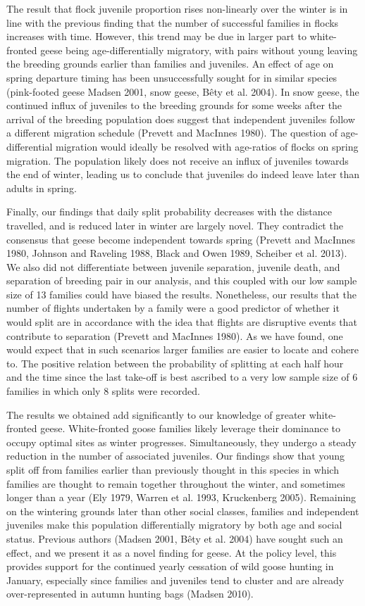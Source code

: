 \documentclass[10pt,twocolumn]{paper}
\begin{document}
The result that flock juvenile proportion rises non-linearly over the
winter is in line with the previous finding that the number of
successful families in flocks increases with time. However, this trend
may be due in larger part to white-fronted geese being
age-differentially migratory, with pairs without young leaving the
breeding grounds earlier than families and juveniles. An effect of age
on spring departure timing has been unsuccessfully sought for in similar
species (pink-footed geese Madsen 2001, snow geese, Bêty et al. 2004).
In snow geese, the continued influx of juveniles to the breeding grounds
for some weeks after the arrival of the breeding population does suggest
that independent juveniles follow a different migration schedule
(Prevett and MacInnes 1980). The question of age-differential migration
would ideally be resolved with age-ratios of flocks on spring migration.
The population likely does not receive an influx of juveniles towards
the end of winter, leading us to conclude that juveniles do indeed leave
later than adults in spring.

Finally, our findings that daily split probability decreases with the
distance travelled, and is reduced later in winter are largely novel.
They contradict the consensus that geese become independent towards
spring (Prevett and MacInnes 1980, Johnson and Raveling 1988, Black and
Owen 1989, Scheiber et al. 2013). We also did not differentiate between
juvenile separation, juvenile death, and separation of breeding pair in
our analysis, and this coupled with our low sample size of 13 families
could have biased the results. Nonetheless, our results that the number
of flights undertaken by a family were a good predictor of whether it
would split are in accordance with the idea that flights are disruptive
events that contribute to separation (Prevett and MacInnes 1980). As we
have found, one would expect that in such scenarios larger families are
easier to locate and cohere to. The positive relation between the
probability of splitting at each half hour and the time since the last
take-off is best ascribed to a very low sample size of 6 families in
which only 8 splits were recorded.

The results we obtained add significantly to our knowledge of greater
white-fronted geese. White-fronted goose families likely leverage their
dominance to occupy optimal sites as winter progresses. Simultaneously,
they undergo a steady reduction in the number of associated juveniles.
Our findings show that young split off from families earlier than
previously thought in this species in which families are thought to
remain together throughout the winter, and sometimes longer than a year
(Ely 1979, Warren et al. 1993, Kruckenberg 2005). Remaining on the
wintering grounds later than other social classes, families and
independent juveniles make this population differentially migratory by
both age and social status. Previous authors (Madsen 2001, Bêty et al.
2004) have sought such an effect, and we present it as a novel finding
for geese. At the policy level, this provides support for the continued
yearly cessation of wild goose hunting in January, especially since
families and juveniles tend to cluster and are already over-represented
in autumn hunting bags (Madsen 2010).
\end{document}
